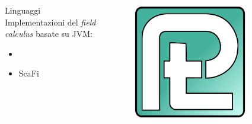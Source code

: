 \begin{frame}{\insertsectionhead}{\insertsubsectionhead}
\begin{columns}
\begin{column}{.7\textwidth}
          \begin{columns}
            \begin{column}{.8\textwidth}
              \begin{block}{Linguaggi}
                Implementazioni del \emph{field calculus} basate su JVM:
                \begin{itemize}
                  \item {}
                  \item ScaFi
                \end{itemize}
              \end{block}
            \end{column}
            \begin{column}{.15\textwidth}
              \begin{figure}
                \includegraphics[width=\textwidth]{../res/fig/protelis-logo.png}
              \end{figure}
            \end{column}
          \end{columns}
        \end{column}
        \begin{column}{.25\textwidth}
          \begin{figure}

\end{figure}
\end{column}
\end{columns}
\end{frame}
